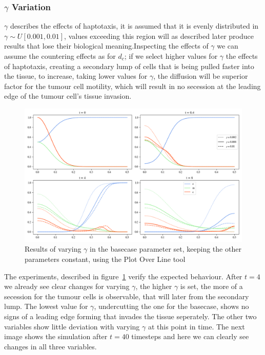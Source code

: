 \subsubsection*{$\gamma$ Variation}
$\gamma$ describes the effects of haptotaxis, it is assumed that it is evenly distributed in $\gamma \sim U[0.001,0.01]$, values exceeding this region will as described later produce results that lose their biological meaning.Inspecting the effects of $\gamma$ we can assume the countering effects as for $d_c$; if we select higher values for $\gamma$ the effects of haptotaxis, creating a secondary lump of cells that is being pulled faster into the tissue, to increase, taking lower values for $\gamma$, the diffusion will be superior factor for the tumour cell motility, which will result in no secession at the leading edge of the tumour cell's tissue invasion.
\begin{figure}[h]
    \centering
    \includegraphics[width=\textwidth]{resources/images/gamma_variation.png}
    \caption{Results of varying $\gamma$ in the basecase parameter set, keeping the other parameters constant, using the Plot Over Line tool}
    \label{fig:gamma_variation}
\end{figure}
The experiments, described in figure~\ref{fig:gamma_variation} verify the expected behaviour. After $t=4$ we already see clear changes for varying $\gamma$, the higher $\gamma$ is set, the more of a secession for the tumour cells is observable, that will later from the secondary lump. The lowest value for $\gamma$, undercutting the one for the basecase, shows no signs of a leading edge forming that invades the tissue seperately. The other two variables show little deviation with varying $\gamma$ at this point in time. \newline 
The next image shows the simulation after $t=40$ timesteps and here we can clearly see changes in all three variables. 
